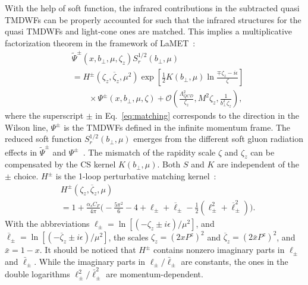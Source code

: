 \documentclass[prd,aps,twocolumn,preprintnumbers, showpacs, nofootinbib,superscriptaddress,notitlepage]{revtex4-1}
\begin{document}
With the help of soft function, the infrared contributions in the subtracted quasi TMDWFs can be properly accounted for such that the infrared structures for the   quasi TMDWFs and light-cone ones are matched. This implies a multiplicative factorization theorem in the framework of LaMET~\cite{Ebert:2019okf,Ji:2019sxk,Ji:2019ewn,Ji:2021znw,Ebert:2022fmh}:
\begin{align}
&\tilde \Psi^{\pm}(x, b_{\perp}, \mu, \zeta_z) S_r^{1/2}(b_{\perp}, \mu) \nonumber\\
&= H^{\pm}\left(\zeta_z, \overline\zeta_z, \mu^2\right) \exp\left[\frac{1}{2}K(b_{\perp},\mu)\ln\frac{\mp\zeta_z- i\epsilon}{\zeta} \right]  \nonumber\\
& \qquad\times \Psi^{\pm}(x, b_\perp, \mu, \zeta)+\mathcal{O}\left(\frac{\Lambda_{QCD}^2}{\zeta_z}, M^2\zeta_z,\frac{1}{b_{\perp}^2\zeta_z}\right),
\label{eq:matching}
\end{align}
where the superscript $\pm$ in Eq.~\eqref{eq:matching} corresponds to the direction in the Wilson line, $\Psi^{\pm}$ is the TMDWFs defined in the inﬁnite momentum frame. The reduced soft function $S^{1/2}_r(b_{\perp}, \mu)$ emerges from the different soft gluon radiation effects in $\tilde \Psi^{\pm}$ and $\Psi^{\pm}$~\cite{Ji:2021znw}. The mismatch  of the rapidity scale $\zeta$ and $\zeta_z$ can be compensated by the CS kernel $K(b_{\perp},\mu)$. Both $S$ and $K$ are independent of the $\pm$ choice.  $H^{\pm}$ is the 1-loop perturbative matching kernel~\cite{Ji:2021znw}:
\begin{align}
& H^{\pm}(\zeta_z, \overline{\zeta}_z,\mu) \nonumber\\
& = 1+  \frac{ \alpha_s C_F}{4\pi} \bigg(-\frac{5\pi^2}{6}-4 +{\ell}_{\pm} + \overline \ell_{\pm} - \frac{1}{2} ({\ell}_{\pm}^2 + \overline \ell_{\pm}^2) \bigg).  \label{eq:1loophardkernel}
\end{align}
With the abbreviations ${\ell}_{\pm} = \ln \left[(-\zeta_z \pm i\epsilon)/\mu^2\right]$, and $\overline {\ell}_{\pm} = \ln \left[(-\overline \zeta_z \pm i\epsilon)/\mu^2\right]$, the scales $\zeta_z = (2x P^z)^2$ and $\overline\zeta_z = \left(2\bar{x} P^z\right)^2$, and $\bar{x}=1-x$. It should be noticed that $H^{\pm}$ contains nonzero imaginary parts in $\ell_{\pm}$ and $\bar{\ell}_{\pm}$. While the imaginary parts in  $\ell_{\pm}/\bar{\ell}_{\pm}$ are constants, the  ones in the double logarithms ${\ell}_{\pm}^2/\bar{\ell}_{\pm}^2$ are momentum-dependent.
\end{document}
